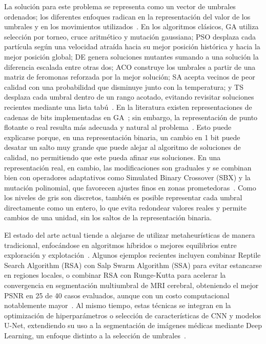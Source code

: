\documentclass[letter, 10pt]{article}
\begin{document}
La soluci\'on para este problema se representa como un vector de umbrales ordenados; los diferentes enfoques radican en la representaci\'on del valor de los umbrales y en los movimientos utilizados~\cite{Hammouche2010Comparative, Manikandan2014Multilevel}.
En los algoritmos cl\'asicos, GA utiliza selecci\'on por torneo, cruce aritm\'etico y mutaci\'on gaussiana; PSO desplaza cada part\'icula seg\'un una velocidad atra\'ida hacia su mejor posici\'on hist\'orica y hacia la mejor posici\'on global;
DE genera soluciones mutantes sumando a una soluci\'on la diferencia escalada entre otras dos; ACO construye los umbrales a partir de una matriz de feromonas reforzada por la mejor soluci\'on;
SA acepta vecinos de peor calidad con una probabilidad que disminuye junto con la temperatura; y TS desplaza cada umbral dentro de un rango acotado, evitando revisitar soluciones recientes mediante una lista tab\'u~\cite{Hammouche2010Comparative}.
En la literatura existen representaciones de cadenas de bits implementadas en GA~\cite{Hammouche2010Comparative}; sin embargo, la representaci\'on de punto flotante o real resulta m\'as adecuada y natural al problema~\cite{Manikandan2014Multilevel}.
Esto puede explicarse porque, en una representaci\'on binaria, un cambio en 1 bit puede desatar un salto muy grande que puede alejar al algoritmo de soluciones de calidad, no permitiendo que este pueda afinar sus soluciones.
En una representaci\'on real, en cambio, las modificaciones son graduales y se combinan bien con operadores adaptativos como Simulated Binary Crossover (SBX) y la mutaci\'on polinomial, que favorecen ajustes finos en zonas prometedoras~\cite{Manikandan2014Multilevel}.
Como los niveles de gris son discretos, tambi\'en es posible representar cada umbral directamente como un entero, lo que evita redondear valores reales y permite cambios de una unidad, sin los saltos de la representaci\'on binaria.

El estado del arte actual tiende a alejarse de utilizar metaheur\'isticas de manera tradicional, enfoc\'andose en algoritmos h\'ibridos o mejores equilibrios entre exploraci\'on y explotaci\'on~\cite{Lameesa2024Role}.
Algunos ejemplos recientes incluyen combinar Reptile Search Algorithm (RSA) con Salp Swarm Algorithm (SSA) para evitar estancarse en regiones locales,
o combinar RSA con Runge-Kutta para acelerar la convergencia en segmentaci\'on multiumbral de MRI cerebral, obteniendo el mejor PSNR en 25 de 40 casos evaluados, aunque con un costo computacional notablemente mayor~\cite{Lameesa2024Role}.
Al mismo tiempo, estas t\'ecnicas se integran en la optimizaci\'on de hiperpar\'ametros o selecci\'on de caracter\'isticas de CNN y modelos U-Net,
extendiendo su uso a la segmentaci\'on de im\'agenes m\'edicas mediante Deep Learning, un enfoque distinto a la selecci\'on de umbrales~\cite{Lameesa2024Role}.
\end{document}
